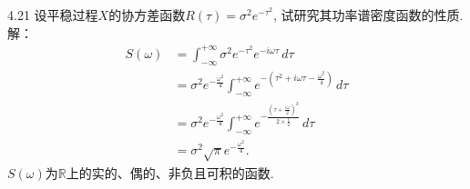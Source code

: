 4.21 设平稳过程$X$的协方差函数$R(\tau) = \sigma^2e^{-\tau^2}$, 试研究其功率谱密度函数的性质.\\
解：
\[
\begin{split}
S(\omega) & = \int^{+\infty}_{-\infty}\sigma^2e^{-\tau^2}e^{-i\omega\tau}\,d\tau\\
		& = \sigma^2e^{-\frac{\omega^2}{4}}\int^{+\infty}_{-\infty}e^{-(\tau^2+i\omega\tau-\frac{\omega^2}{4})}\,d\tau\\
		& = \sigma^2e^{-\frac{\omega^2}{4}}\int^{+\infty}_{-\infty}e^{-\frac{(\tau+\frac{i\omega}{2})^2}{2\times \frac{1}{2}}}\,d\tau\\
		& = \sigma^2\sqrt{\pi}e^{-\frac{\omega^2}{4}}.
\end{split}
\]
$S(\omega)$为$\mathbb{R}$上的实的、偶的、非负且可积的函数.\\

